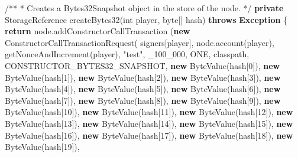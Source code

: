 \documentclass[a4paper,]{book}
\newenvironment{Shaded}{\begin{snugshade}}{\end{snugshade}}
\newcommand{\BuiltInTok}[1]{\textcolor[rgb]{0.39,0.29,0.61}{\textbf{#1}}}
\newcommand{\CommentTok}[1]{\textcolor[rgb]{0.54,0.53,0.53}{#1}}
\newcommand{\DataTypeTok}[1]{\textcolor[rgb]{0.00,0.34,0.68}{#1}}
\newcommand{\DecValTok}[1]{\textcolor[rgb]{0.69,0.50,0.00}{#1}}
\newcommand{\FunctionTok}[1]{\textcolor[rgb]{0.39,0.29,0.61}{#1}}
\newcommand{\KeywordTok}[1]{\textcolor[rgb]{0.12,0.11,0.11}{\textbf{#1}}}
\newcommand{\NormalTok}[1]{\textcolor[rgb]{0.12,0.11,0.11}{#1}}
\newcommand{\StringTok}[1]{\textcolor[rgb]{0.75,0.01,0.01}{#1}}
\renewenvironment{Shaded}{\begin{snugshade}\small}{\end{snugshade}}
\begin{document}
{\begin{Shaded}
\begin{Highlighting}[]
  \CommentTok{/**}
   \CommentTok{*}\NormalTok{ Creates a Bytes32Snapshot object in the store of the node}\CommentTok{.}
   \CommentTok{*/}
  \KeywordTok{private}\NormalTok{ StorageReference }\FunctionTok{createBytes32}\NormalTok{(}\DataTypeTok{int}\NormalTok{ player, }\DataTypeTok{byte}\NormalTok{[] hash) }\KeywordTok{throws} \BuiltInTok{Exception}\NormalTok{ \{}
    \KeywordTok{return}\NormalTok{ node.}\FunctionTok{addConstructorCallTransaction}
\NormalTok{      (}\KeywordTok{new} \FunctionTok{ConstructorCallTransactionRequest}\NormalTok{(}
\NormalTok{        signers[player],}
\NormalTok{        node.}\FunctionTok{account}\NormalTok{(player),}
        \FunctionTok{getNonceAndIncrement}\NormalTok{(player), }\StringTok{"test"}\NormalTok{,}
\NormalTok{        _}\DecValTok{100_000}\NormalTok{, ONE, classpath, CONSTRUCTOR_BYTES32_SNAPSHOT,}
        \KeywordTok{new} \FunctionTok{ByteValue}\NormalTok{(hash[}\DecValTok{0}\NormalTok{]), }\KeywordTok{new} \FunctionTok{ByteValue}\NormalTok{(hash[}\DecValTok{1}\NormalTok{]),}
        \KeywordTok{new} \FunctionTok{ByteValue}\NormalTok{(hash[}\DecValTok{2}\NormalTok{]), }\KeywordTok{new} \FunctionTok{ByteValue}\NormalTok{(hash[}\DecValTok{3}\NormalTok{]),}
        \KeywordTok{new} \FunctionTok{ByteValue}\NormalTok{(hash[}\DecValTok{4}\NormalTok{]), }\KeywordTok{new} \FunctionTok{ByteValue}\NormalTok{(hash[}\DecValTok{5}\NormalTok{]),}
        \KeywordTok{new} \FunctionTok{ByteValue}\NormalTok{(hash[}\DecValTok{6}\NormalTok{]), }\KeywordTok{new} \FunctionTok{ByteValue}\NormalTok{(hash[}\DecValTok{7}\NormalTok{]),}
        \KeywordTok{new} \FunctionTok{ByteValue}\NormalTok{(hash[}\DecValTok{8}\NormalTok{]), }\KeywordTok{new} \FunctionTok{ByteValue}\NormalTok{(hash[}\DecValTok{9}\NormalTok{]),}
        \KeywordTok{new} \FunctionTok{ByteValue}\NormalTok{(hash[}\DecValTok{10}\NormalTok{]), }\KeywordTok{new} \FunctionTok{ByteValue}\NormalTok{(hash[}\DecValTok{11}\NormalTok{]),}
        \KeywordTok{new} \FunctionTok{ByteValue}\NormalTok{(hash[}\DecValTok{12}\NormalTok{]), }\KeywordTok{new} \FunctionTok{ByteValue}\NormalTok{(hash[}\DecValTok{13}\NormalTok{]),}
        \KeywordTok{new} \FunctionTok{ByteValue}\NormalTok{(hash[}\DecValTok{14}\NormalTok{]), }\KeywordTok{new} \FunctionTok{ByteValue}\NormalTok{(hash[}\DecValTok{15}\NormalTok{]),}
        \KeywordTok{new} \FunctionTok{ByteValue}\NormalTok{(hash[}\DecValTok{16}\NormalTok{]), }\KeywordTok{new} \FunctionTok{ByteValue}\NormalTok{(hash[}\DecValTok{17}\NormalTok{]),}
        \KeywordTok{new} \FunctionTok{ByteValue}\NormalTok{(hash[}\DecValTok{18}\NormalTok{]), }\KeywordTok{new} \FunctionTok{ByteValue}\NormalTok{(hash[}\DecValTok{19}\NormalTok{]),}

\end{Highlighting}
\end{Shaded}}
\end{document}
